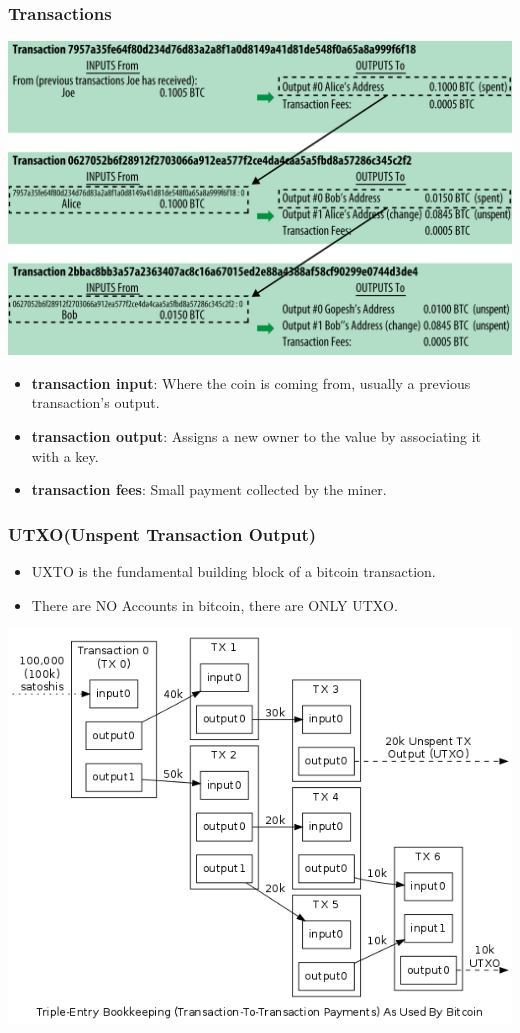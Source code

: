 \begin{frame}
    \frametitle{Transactions}
    \includegraphics[scale=0.6]{./figures/mbc2_0204.png}
    \begin{itemize}
        \item \textbf{transaction input}: Where the coin is coming from, usually a previous transaction's output.
        \item \textbf{transaction output}: Assigns a new owner to the value by associating it with a key.
        \item \textbf{transaction fees}: Small payment collected by the miner.
    \end{itemize}
\end{frame}

\begin{frame}
    \frametitle{UTXO(Unspent Transaction Output)}
    \begin{itemize}
        \item UXTO is the fundamental building block of a bitcoin transaction.
        \item There are \alert{NO Accounts} in bitcoin, there are \alert{ONLY UTXO}.
    \end{itemize}
    \includegraphics[scale=0.4]{./figures/en-transaction-propagation.png}
\end{frame}

